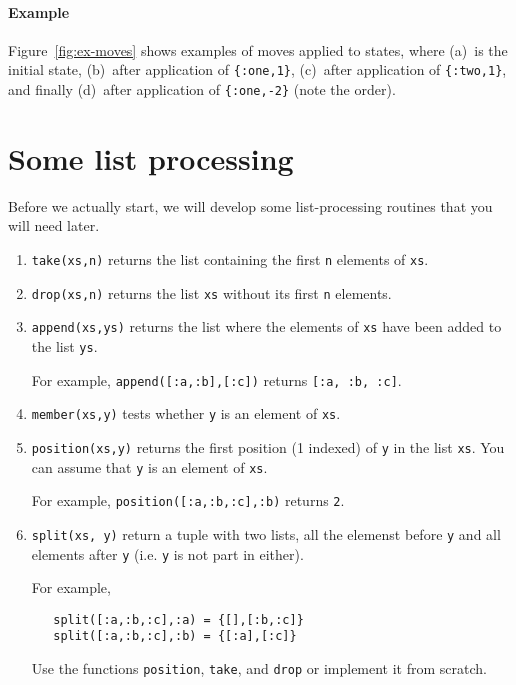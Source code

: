 \documentclass[a4paper,11pt]{article}
\begin{document}
\paragraph{Example}

Figure~\ref{fig:ex-moves} shows examples of moves applied to
states, where (a)~is the initial state, (b)~after application of
\verb+{:one,1}+, (c)~after application of \verb+{:two,1}+, and finally
(d)~after application of \verb+{:one,-2}+ (note the order).

\section*{Some list processing}

Before we actually start, we will develop some list-processing
routines that you will need later.
\begin{enumerate}

\item \verb+take(xs,n)+ returns the list containing the first \verb+n+
  elements of \verb+xs+.

\item \verb+drop(xs,n)+ returns the list \verb+xs+ without its first
  \verb+n+ elements.

\item \verb+append(xs,ys)+ returns the list where the elements of
  \verb+xs+ have been added to the list \verb+ys+.

  For example, \verb+append([:a,:b],[:c])+ returns \verb+[:a, :b, :c]+.
  
\item \verb+member(xs,y)+ tests whether \verb+y+ is an element of \verb+xs+.

\item \verb+position(xs,y)+ returns the first position (1 indexed) of \verb+y+ in
  the list \verb+xs+. You can assume that \verb+y+ is an element of
  \verb+xs+.

  For example, \verb+position([:a,:b,:c],:b)+ returns \verb+2+.

\item \verb+split(xs, y)+ return a tuple with two lists, all the
  elemenst before \verb+y+ and all elements after \verb+y+
  (i.e. \verb+y+ is not part in either).

  For example, 
\begin{verbatim}
   split([:a,:b,:c],:a) = {[],[:b,:c]}
   split([:a,:b,:c],:b) = {[:a],[:c]}
\end{verbatim}
  
  Use the functions \verb+position+, \verb+take+, and \verb+drop+ or
  implement it from scratch.
  
\end{enumerate}
\end{document}
